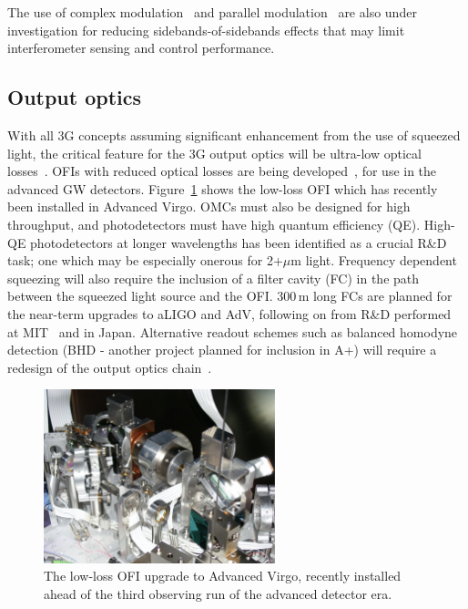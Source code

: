 The use of complex modulation~\cite{complexmod} and parallel modulation~\cite{kagraMZI} are also under investigation for reducing sidebands-of-sidebands effects that may limit interferometer sensing and control performance.

\subsection{Output optics}
With all 3G concepts assuming significant enhancement from the use of squeezed light, the critical feature for the 3G output optics will be ultra-low optical losses~\cite{squeeze_lossbudget}. OFIs with reduced optical losses are being developed~\cite{EGOLLFI,UFLLFI}, for use in the advanced GW detectors. Figure~\ref{fig:AdVLLFI} shows the low-loss OFI which has recently been installed in Advanced Virgo. OMCs must also be designed for high throughput, and photodetectors must have high quantum efficiency (QE). High-QE photodetectors at longer wavelengths has been identified as a crucial R\&D task; one which may be especially onerous for 2+$\mu$m light. Frequency dependent squeezing will also require the inclusion of a filter cavity (FC) in the path between the squeezed light source and the OFI. 300\,m long FCs are planned for the near-term upgrades to aLIGO and AdV, following on from R\&D performed at MIT~\cite{MITFC} and in Japan\cite{TAMA_FDS2016}. Alternative readout schemes such as balanced homodyne detection (BHD - another project planned for inclusion in A+) will require a redesign of the output optics chain~\cite{BHD}.

\begin{figure}[htb]
\centering
\includegraphics[width=0.6\textwidth]{Figures/LLFI.png}
\caption{The low-loss OFI upgrade to Advanced Virgo, recently installed ahead of the third observing run of the advanced detector era.\label{fig:AdVLLFI}}
\end{figure}

